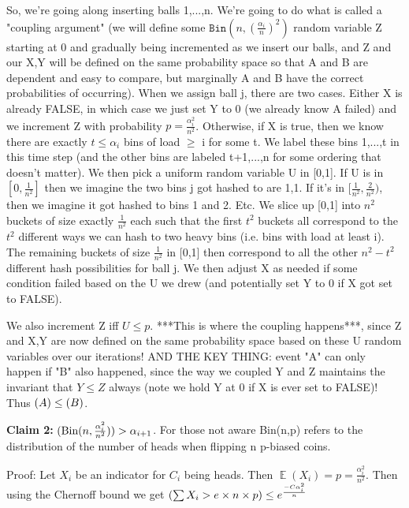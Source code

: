 \documentclass[11pt]{article}
\DeclareMathOperator*{\E}{\mathbb{E}}
\let\Pr\relax
\DeclareMathOperator*{\Pr}{\mathbb{P}}
\newcommand{\bin}{\texttt{Bin}}
\begin{document}
So, we're going along inserting balls 1,...,n. We're going to do what
is called a "coupling argument" (we will define some $\bin(n,
(\frac{\alpha_i}{n})^2)$ random variable Z starting at 0 and gradually being
incremented as we insert our balls, and Z and our X,Y will be defined
on the same probability space so that A and B are dependent and easy
to compare, but marginally A and B have the correct probabilities of
occurring). When we assign ball j, there are two cases. Either X is
already FALSE, in which case we just set Y to 0 (we already know A
failed) and we increment Z with probability $p = \frac{\alpha_i^2}{n^2}$.
Otherwise, if X is true, then we know there are exactly $t \leq \alpha_i$
bins of load $\geq$ i for some t. We label these bins 1,...,t in this time
step (and the other bins are labeled t+1,...,n for some ordering that
doesn't matter). We then pick a uniform random variable U in [0,1]. If
U is in $[0, \frac{1}{n^2}]$ then we imagine the two bins j got hashed to are
1,1. If it's in $[\frac{1}{n^2}, \frac{2}{n^2})$, then we imagine it got hashed to bins
1 and 2. Etc. We slice up [0,1] into $n^2$ buckets of size exactly $\frac{1}{n^2}$
each such that the first $t^2$ buckets all correspond to the $t^2$
different ways we can hash to two heavy bins (i.e. bins with load at
least i). The remaining buckets of size $\frac{1}{n^2}$ in [0,1] then correspond
to all the other $n^2 - t^2$ different hash possibilities for ball j. We
then adjust X as needed if some condition failed based on the U we
drew (and potentially set Y to 0 if X got set to FALSE).

We also increment Z iff $U \leq p$. ***This is where the coupling
happens***, since Z and X,Y are now defined on the same probability
space based on these U random variables over our iterations! AND THE
KEY THING: event "A" can only happen if "B" also happened, since the
way we coupled Y and Z maintains the invariant that $Y \leq Z$ always
(note we hold Y at 0 if X is ever set to FALSE)! Thus $\Pr(A) \leq \Pr(B)$.



\textbf{Claim 2:} $\Pr{(\textnormal{Bin}(n, \frac{\alpha_i^2}{n^2})) > \alpha_{i+1}}$.  For those not aware Bin(n,p) refers to the distribution of the number of heads when flipping n p-biased coins.

Proof: Let $X_i$ be an indicator for $C_i$ being heads.  Then $\E(X_i) = p = \frac{\alpha_i^2}{n^2}$.   Then using the Chernoff bound we get $\Pr( \sum X_i > e \times n \times p) \leq e^{\frac{-C\alpha_i^2}{n}} $
\end{document}
